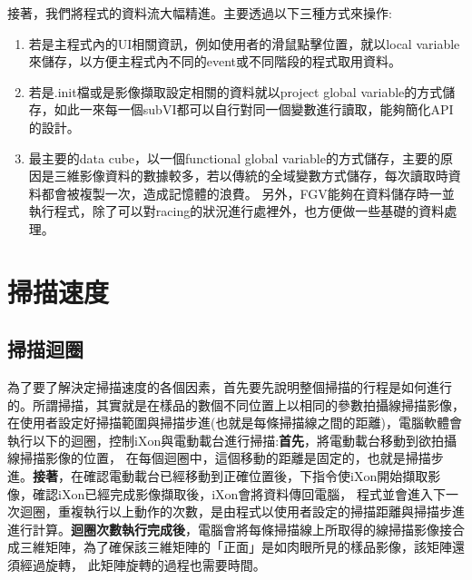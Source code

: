 \documentclass[12pt]{article}
\begin{document}
    接著，我們將程式的資料流大幅精進。主要透過以下三種方式來操作:
    \begin{enumerate}
        \item 若是主程式內的UI相關資訊，例如使用者的滑鼠點擊位置，就以local variable來儲存，以方便主程式內不同的event或不同階段的程式取用資料。
        \item 若是.init檔或是影像擷取設定相關的資料就以project global variable的方式儲存，如此一來每一個subVI都可以自行對同一個變數進行讀取，能夠簡化API的設計。
        \item 最主要的data cube，以一個functional global variable的方式儲存，主要的原因是三維影像資料的數據較多，若以傳統的全域變數方式儲存，每次讀取時資料都會被複製一次，造成記憶體的浪費。
        另外，FGV能夠在資料儲存時一並執行程式，除了可以對racing的狀況進行處裡外，也方便做一些基礎的資料處理。
    \end{enumerate}
    \section{掃描速度}
    \subsection{掃描迴圈}
    為了要了解決定掃描速度的各個因素，首先要先說明整個掃描的行程是如何進行的。所謂掃描，其實就是在樣品的數個不同位置上以相同的參數拍攝線掃描影像，
    在使用者設定好掃描範圍與掃描步進(也就是每條掃描線之間的距離)，電腦軟體會執行以下的迴圈，控制iXon與電動載台進行掃描:\textbf{首先}，將電動載台移動到欲拍攝線掃描影像的位置，
    在每個迴圈中，這個移動的距離是固定的，也就是掃描步進。\textbf{接著}，在確認電動載台已經移動到正確位置後，下指令使iXon開始擷取影像，確認iXon已經完成影像擷取後，iXon會將資料傳回電腦，
    程式並會進入下一次迴圈，重複執行以上動作的次數，是由程式以使用者設定的掃描距離與掃描步進進行計算。\textbf{迴圈次數執行完成後}，電腦會將每條掃描線上所取得的線掃描影像接合成三維矩陣，為了確保該三維矩陣的「正面」是如肉眼所見的樣品影像，該矩陣還須經過旋轉，
    此矩陣旋轉的過程也需要時間。
\end{document}
